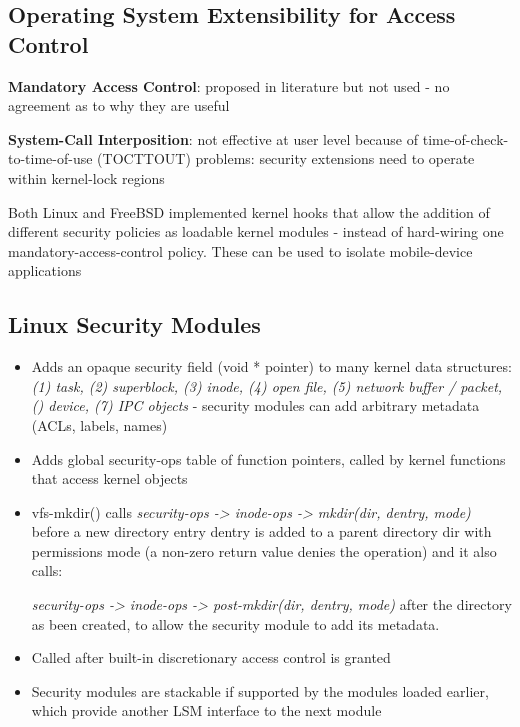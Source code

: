 \documentclass{article}
\newenvironment{example}{\par\color{brown}}{\par}
\begin{document}
\subsection{Operating System Extensibility for Access Control}
\textbf{Mandatory Access Control}: proposed in literature but not used - no agreement as to why they are useful

\bigskip
\noindent
\textbf{System-Call Interposition}: not effective at user level because of time-of-check-to-time-of-use (TOCTTOUT) problems: security extensions need to operate within kernel-lock regions

\bigskip
\noindent
Both Linux and FreeBSD implemented kernel hooks that allow the addition of different security policies as loadable kernel modules - instead of hard-wiring one mandatory-access-control policy. These can be used to isolate mobile-device applications

\subsection{Linux Security Modules}
\begin{itemize}
	\item Adds an opaque security field (void * pointer) to many kernel data structures: \textit{(1) task, (2) superblock, (3) inode, (4) open file, (5) network buffer / packet, () device, (7) IPC objects} - security modules can add arbitrary metadata (ACLs, labels, names) 
	\item Adds global security-ops table of function pointers, called by kernel functions that access kernel objects
	\begin{example}
	\item vfs-mkdir() calls \textit{security-ops -> inode-ops -> mkdir(dir, dentry, mode)} before a new directory entry dentry is added to a parent directory dir with permissions mode (a non-zero return value denies the operation) and it also calls:

	\textit{security-ops -> inode-ops -> post-mkdir(dir, dentry, mode)} after the directory as been created, to allow the security module to add its metadata.
	
	\end{example}

	\item Called after built-in discretionary access control is granted
	
	\item Security modules are stackable if supported by the modules loaded earlier, which provide another LSM interface to the next module
\end{itemize}
\end{document}
